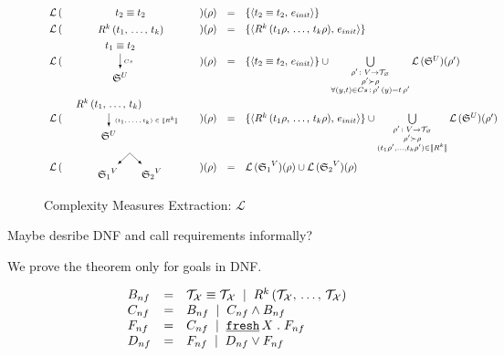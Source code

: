 \begin{figure}[t]
\[
\begin{array}{rclcl}
 \mathcal{L}\,(&\parbox[m]{1.3cm}{\schemenode{$\unigoal{t_2}{t_2}$}}&)(\rho) &=& \{\taskst{\unigoal{t_2}{t_2}}{e_{init}}\} \\

 \mathcal{L}\,(&\parbox[m]{2.5cm}{\schemenode{$\invokegoal{R^k}{t_1}{t_k}$}}&)(\rho) &=& \{\taskst{\invokegoal{R^k}{t_1 \rho}{t_k \rho}}{e_{init}}\} \\

 \mathcal{L}\,(&\parbox[m]{2cm}{\schemesarrow{$\unigoal{t_1}{t_2}$}{$Cs$}{$\schemewithvset{\mathfrak{S}}{U}$}} &)(\rho) &=&  \{\taskst{\unigoal{t_2}{t_2}}{e_{init}}\} \cup
      \bigcup\limits_{\substack{ \rho' \colon V \to \grterms \\
                                      \rho' \succ \rho \\
                                      \forall (y, t) \in Cs\,:\, \rho'\,(y) = t\, \rho'  }}
           \mathcal{L}\,(\schemewithvset{\mathfrak{S}}{U})(\rho')  \\

 \mathcal{L}\,(& \parbox[m]{4cm}{\schemedarrow{$\invokegoal{R^k}{t_1}{t_k}$}{ $(t_1, \dots, t_k) \in \sembr{R^k}  $}{$\schemewithvset{\mathfrak{S}}{U}$}} &)(\rho) &=&
      \{\taskst{\invokegoal{R^k}{t_1 \rho}{t_k \rho}}{e_{init}}\} \cup
      \bigcup\limits_{\substack{ \rho' \colon V \to \grterms \\
                                      \rho' \succ \rho \\
                                      (t_1 \rho', \dots, t_k \rho') \in \sembr{R^k}  }}
           \mathcal{L}\,(\schemewithvset{\mathfrak{S}}{U})(\rho')  \\

 \mathcal{L}\,(&\parbox[m]{2.5cm}{\schemefork{$\schemewithvset{\mathfrak{S}_1}{V}$}{$\schemewithvset{\mathfrak{S}_2}{V}$}}&)(\rho) &=&
 \mathcal{L}\,(\schemewithvset{\mathfrak{S}_1}{V})(\rho) \cup \mathcal{L}\,(\schemewithvset{\mathfrak{S}_2}{V})(\rho)
\end{array}
\]
\caption{Complexity Measures Extraction: $\mathcal L$}
\label{fig:scheduling_extraction_l}
\end{figure}

\colorbox{yellow!20}{\parbox{\textwidth}{Maybe desribe DNF and call requirements informally?}}

We prove the theorem only for goals in DNF.

\[
\begin{array}{lcl}
B_{nf} & = &  \mathcal{T}_\mathcal{X} \equiv \mathcal{T}_\mathcal{X} \; \mid \;
                     R^k\,(\mathcal{T}_\mathcal{X}, \, \dots, \, \mathcal{T}_\mathcal{X}) \\
C_{nf} & = & B_{nf} \; \mid \; C_{nf} \land B_{nf} \\
F_{nf} & = & C_{nf} \; \mid \; \texttt{\underline {fresh}} \, X\;.\; F_{nf} \\
D_{nf} & = & F_{nf} \; \mid \; D_{nf} \lor F_{nf}
\end{array}
\]

